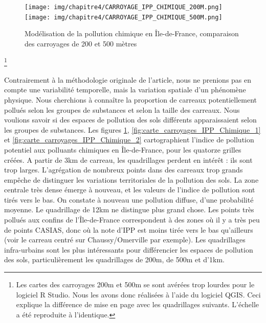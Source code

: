 \documentclass[a4paper,twoside,12pt]{book}
\begin{document}
\clearpage
\begin{figure}[!h] 
\centering  
\texttt{[image: img/chapitre4/CARROYAGE\_IPP\_CHIMIQUE\_200M.png]} 
\texttt{[image: img/chapitre4/CARROYAGE\_IPP\_CHIMIQUE\_500M.png]} 
\caption{Modélisation de la pollution chimique en Île-de-France, comparaison des carroyages de 200 et 500 mètres} 
\label{fig:carte_IPP_Chimique_200m_500m}
\end{figure} 

\footnote{Les cartes des carroyages 200m et 500m se sont avérées trop lourdes pour le logiciel R Studio. Nous les avons donc réalisées à l'aide du logiciel QGIS. Ceci explique la différence de mise en page avec les quadrillages suivants. L'échelle a été reproduite à l'identique.}

Contrairement à la méthodologie originale de l'article, nous ne prenions pas en compte une variabilité temporelle, mais la variation spatiale d'un phénomène physique. Nous cherchions à connaître la proportion de carreaux potentiellement pollués selon les groupes de substances et selon la taille des carreaux. Nous voulions savoir si des espaces de pollution des sols différents apparaissaient selon les groupes de substances. Les figures \ref{fig:carte_IPP_Chimique_200m_500m}, \ref{fig:carte_carroyages_IPP_Chimique_1} et \ref{fig:carte_carroyages_IPP_Chimique_2} cartographient l'indice de pollution potentiel aux polluants chimiques en Île-de-France, pour les quatorze grilles créées. A partir de 3km de carreau, les quadrillages perdent en intérêt : ils sont trop larges. L'agrégation de nombreux points dans des carreaux trop grands empêche de distinguer les variations territoriales de la pollution des sols. La zone centrale très dense émerge à nouveau, et les valeurs de l'indice de pollution sont tirés vers le bas. On constate à nouveau une pollution diffuse, d'une probabilité moyenne. Le quadrillage de 12km ne distingue plus grand chose. Les points très pollués aux confins de l'Île-de-France correspondent à des zones où il y a très peu de points CASIAS, donc où la note d'IPP est moins tirée vers le bas qu'ailleurs (voir le carreau centré sur Chaussy/Omerville par exemple). Les quadrillages infra-urbains sont les plus intéressants pour différencier les espaces de pollution des sols, particulièrement les quadrillages de 200m, de 500m et d'1km. 
\end{document}
